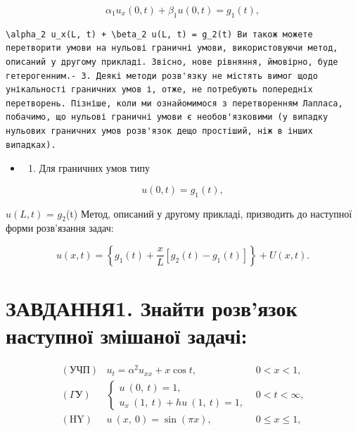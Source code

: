 \documentclass[
  ukrainian,
]{article}
\providecommand{\tightlist}{%
  \setlength{\itemsep}{0pt}\setlength{\parskip}{0pt}}
\begin{document}
\[
\alpha_1 u_x(0, t) + \beta_1 u(0, t) = g_1(t),
\]

\begin{verbatim}
\alpha_2 u_x(L, t) + \beta_2 u(L, t) = g_2(t) Ви також можете перетворити умови на нульові граничні умови, використовуючи метод, описаний у другому прикладі. Звісно, нове рівняння, ймовірно, буде гетерогенним.- 3. Деякі методи розв'язку не містять вимог щодо унікальності граничних умов і, отже, не потребують попередніх перетворень. Пізніше, коли ми ознайомимося з перетворенням Лапласа, побачимо, що нульові граничні умови є необов'язковими (у випадку нульових граничних умов розв'язок дещо простіший, ніж в інших випадках).
\end{verbatim}

\begin{itemize}
\tightlist
\item
  \begin{enumerate}
  \def\labelenumi{\arabic{enumi}.}
  \setcounter{enumi}{3}
  \tightlist
  \item
    Для граничних умов типу
  \end{enumerate}
\end{itemize}

\[
u(0, t) = g_1(t),
\]

\(u(L, t)\) = \(g_2\)(t) Метод, описаний у другому прикладі, призводить
до наступної форми розв'язання задач:

\[
u(x, t) = \left\{ g_1(t) + \frac{x}{L} \left[ g_2(t) - g_1(t) \right] \right\} + U(x, t).
\]

\section{ЗАВДАННЯ1. Знайти розв'язок наступної змішаної
задачі:}\label{ux437ux430ux432ux434ux430ux43dux43dux44f1.-ux437ux43dux430ux439ux442ux438-ux440ux43eux437ux432ux44fux437ux43eux43a-ux43dux430ux441ux442ux443ux43fux43dux43eux457-ux437ux43cux456ux448ux430ux43dux43eux457-ux437ux430ux434ux430ux447ux456}

\[
\begin{array}{lll} (\text{УЧП}) & u_t = \alpha^2 u_{xx} + x \cos t, & 0 < x < 1, \\ (\Gamma \text{У}) & \begin{cases} u \ (0, \ t) = 1, \\ u_x \ (1, \ t) + hu \ (1, \ t) = 1, \end{cases} & 0 < t < \infty, \\ (\text{HY}) & u \ (x, \ 0) = \sin (\pi x), & 0 \leqslant x \leqslant 1, \end{array}
\]
\end{document}
